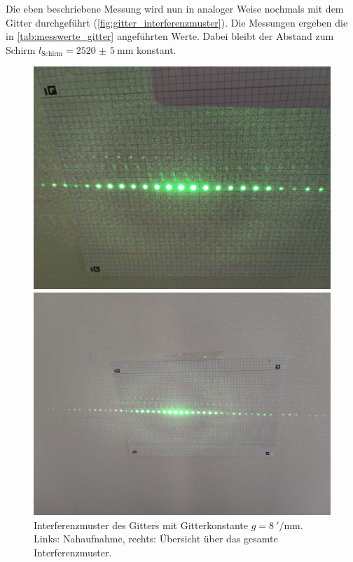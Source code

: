 \documentclass[ngerman]{scrartcl}
\begin{document}
Die eben beschriebene Messung wird nun in analoger Weise nochmals mit dem Gitter durchgeführt (\autoref{fig:gitter_interferenzmuster}). Die Messungen ergeben die in \autoref{tab:messwerte_gitter} angeführten Werte. Dabei bleibt der Abstand zum Schirm $l_\text{Schirm} = \SI{2520(5)}{\milli\meter}$ konstant.

\setcapindent{0pt}
\begin{figure}[H]
    \centering
    \begin{minipage}[t]{0.45\linewidth}
        \centering
        \includegraphics[width=\linewidth]{fig/Compressed/Gitter_8_per_mm.jpg}
    \end{minipage}%
    \hspace*{\fill}
    \begin{minipage}[t]{0.45\linewidth}
        \centering
        \includegraphics[width=\linewidth]{fig/Compressed/Gitter_8_per_mm_overview.jpg}
    \end{minipage}
    \caption[Interferenzmuster des Gitters]{Interferenzmuster des Gitters mit Gitterkonstante $g=\SI{8}{'\per\milli\meter}$. Links: Nahaufnahme, rechts: Übersicht über das gesamte Interferenzmuster.}
    \label{fig:gitter_interferenzmuster}
\end{figure}
\setcaphanging
\end{document}
